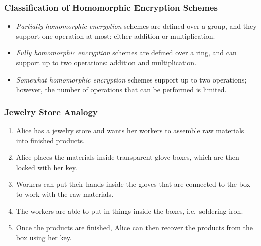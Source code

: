 \documentclass{beamer}
\begin{document}
\begin{frame}
\frametitle{Classification of Homomorphic Encryption Schemes}
\begin{itemize}
  \setlength\itemsep{1.5em}
\item \emph{Partially homomorphic encryption} schemes are defined over a group, and they support one operation at most: either addition or multiplication.  
\item \emph{Fully homomorphic encryption} schemes are defined over a ring, and can support up to two operations: addition and multiplication. 
\item \emph{Somewhat homomorphic encryption} schemes support up to two operations; however, the number of operations that can be performed is limited.
\end{itemize}

\end{frame}
\begin{frame}
\frametitle{Jewelry Store Analogy}

\begin{enumerate}
  \setlength\itemsep{1.5em}
\item Alice has a jewelry store and wants her workers to assemble raw materials into finished products.
\item Alice places the materials inside transparent glove boxes, which are then locked with her key.
\item Workers can put their hands inside the gloves that are connected to the box to work with the raw materials. 
\item The workers are able to put in things inside the boxes, i.e.\ soldering iron. 
\item Once the products are finished, Alice can then recover the products from the box using her key. 
\end{enumerate}

\end{frame}
\end{document}
